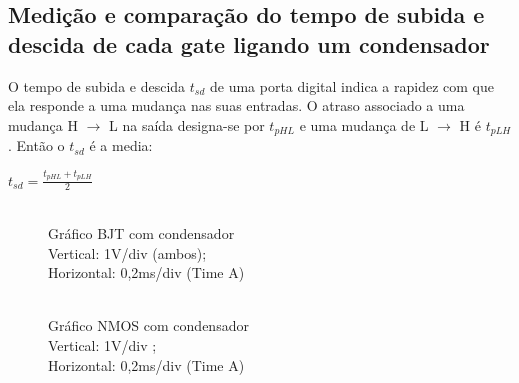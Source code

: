 \documentclass[pdftex,12pt,a4paper]{report}
\begin{document}
\subsection{Medição e comparação do tempo de subida e descida de cada gate ligando um condensador}

O tempo de subida e descida $t_{sd}$ de uma porta digital indica a rapidez com que ela responde a uma mudança nas suas entradas. O atraso associado a uma mudança H $\rightarrow$ L na saída designa-se por $t_{pHL}$ e uma mudança de L $\rightarrow$ H é $t_{pLH}$. Então o $t_{sd}$ é a media:

\centerline{$t_{sd} = \frac{t_{pHL}+t_{pLH}}{2}$}

\begin{figure}[!htb]
  \centerline{}
  \caption{\\Gráfico BJT com condensador\\Vertical: 1V/div (ambos); \\Horizontal: 0,2ms/div (Time A)}\label{bjt}
\endminipage\hfill
{}
  \centerline{}
  \caption{\\Gráfico NMOS com condensador \\Vertical: 1V/div ; \\Horizontal: 0,2ms/div (Time A) }\label{fig:nmos}
\endminipage\hfill
\end{figure}
\end{document}
